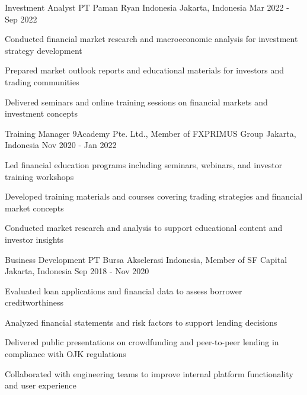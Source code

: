 \begin{cventries}
  \cventry
    {Investment Analyst} %
    {PT Paman Ryan Indonesia} %
    {Jakarta, Indonesia} %
    {Mar 2022 - Sep 2022} %
    {
      \begin{cvitems} %
        \item {Conducted financial market research and macroeconomic analysis for investment strategy development}
        \item {Prepared market outlook reports and educational materials for investors and trading communities}
        \item {Delivered seminars and online training sessions on financial markets and investment concepts}
      \end{cvitems}
    }

  \cventry
    {Training Manager} %
    {9Academy Pte. Ltd., Member of FXPRIMUS Group } %
    {Jakarta, Indonesia} %
    {Nov 2020 - Jan 2022} %
    {
      \begin{cvitems} %
        \item {Led financial education programs including seminars, webinars, and investor training workshops}
        \item {Developed training materials and courses covering trading strategies and financial market concepts}
        \item {Conducted market research and analysis to support educational content and investor insights}
      \end{cvitems}
    }

  \cventry
    {Business Development} %
    {PT Bursa Akselerasi Indonesia, Member of SF Capital} %
    {Jakarta, Indonesia} %
    {Sep 2018 - Nov 2020} %
    {
      \begin{cvitems} %
        \item {Evaluated loan applications and financial data to assess borrower creditworthiness}
        \item {Analyzed financial statements and risk factors to support lending decisions}
        \item {Delivered public presentations on crowdfunding and peer-to-peer lending in compliance with OJK regulations}
        \item {Collaborated with engineering teams to improve internal platform functionality and user experience}
      \end{cvitems}
    }


\end{cventries}
